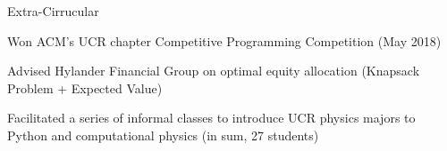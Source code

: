 \documentclass{resume} %
\newcommand{\tab}[1]{\hspace{.2667\textwidth}\rlap{#1}}
\newcommand{\itab}[1]{\hspace{0em}\rlap{#1}}
\begin{document}



\begin{rSection}{Extra-Cirrucular} \itemsep -3pt
\item Won ACM's UCR chapter Competitive Programming Competition (May 2018)
\item Advised Hylander Financial Group on optimal equity allocation (Knapsack Problem + Expected Value)
\item Facilitated a series of informal classes to introduce UCR physics majors to Python and computational physics (in sum, 27 students)
\end{rSection}
\end{document}
